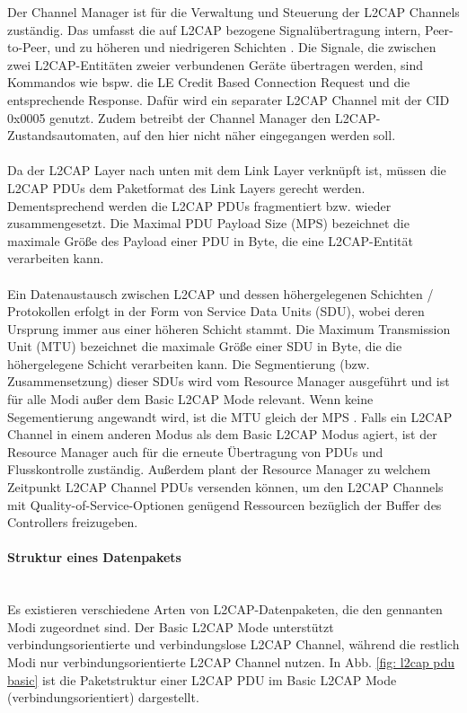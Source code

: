 Der Channel Manager ist für die Verwaltung und Steuerung der L2CAP Channels zuständig. Das umfasst die auf L2CAP bezogene Signalübertragung intern, Peer-to-Peer, und zu höheren und niedrigeren Schichten \cite{BtSpec4.0_1390}. 
Die Signale, die zwischen zwei L2CAP-Entitäten zweier verbundenen Geräte übertragen werden, sind Kommandos wie bspw. die LE Credit Based Connection Request und die entsprechende Response. Dafür wird ein separater L2CAP Channel mit der CID 0x0005 genutzt. Zudem betreibt der Channel Manager den L2CAP-Zustandsautomaten, auf den hier nicht näher eingegangen werden soll.
\\\\
Da der L2CAP Layer nach unten mit dem Link Layer verknüpft ist, müssen die L2CAP PDUs dem Paketformat des Link Layers gerecht werden. Dementsprechend werden die L2CAP PDUs fragmentiert bzw. wieder zusammengesetzt. Die Maximal PDU Payload Size (MPS) bezeichnet die maximale Größe des Payload einer PDU in Byte, die eine L2CAP-Entität verarbeiten kann.
\\\\
Ein Datenaustausch zwischen L2CAP und dessen höhergelegenen Schichten / Protokollen erfolgt in der Form von Service Data Units (SDU), wobei deren Ursprung immer aus einer höheren Schicht stammt. Die Maximum Transmission Unit (MTU) bezeichnet die maximale Größe einer SDU in Byte, die die höhergelegene Schicht verarbeiten kann. Die Segmentierung (bzw. Zusammensetzung) dieser SDUs wird vom Resource Manager ausgeführt und ist für alle Modi außer dem Basic L2CAP Mode relevant. Wenn keine Segementierung angewandt wird, ist die MTU gleich der MPS \cite{BtSpec4.2_1727}. Falls ein L2CAP Channel in einem anderen Modus als dem Basic L2CAP Modus agiert, ist der Resource Manager auch für die erneute Übertragung von PDUs und Flusskontrolle zuständig. Außerdem plant der Resource Manager zu welchem Zeitpunkt L2CAP Channel PDUs versenden können, um den L2CAP Channels mit Quality-of-Service-Optionen genügend Ressourcen bezüglich der Buffer des Controllers freizugeben. \cite{BtSpec4.2_185} \cite{BtSpec4.2_1725-1726}

\paragraph{Struktur eines Datenpakets} \mbox{} \vspace{0.2cm} \\
Es existieren verschiedene Arten von L2CAP-Datenpaketen, die den gennanten Modi zugeordnet sind. Der Basic L2CAP Mode unterstützt verbindungsorientierte und verbindungslose L2CAP Channel, während die restlich Modi nur verbindungsorientierte L2CAP Channel nutzen.
In Abb. \ref{fig: l2cap pdu basic} ist die Paketstruktur einer L2CAP PDU im Basic L2CAP Mode (verbindungsorientiert) dargestellt.

